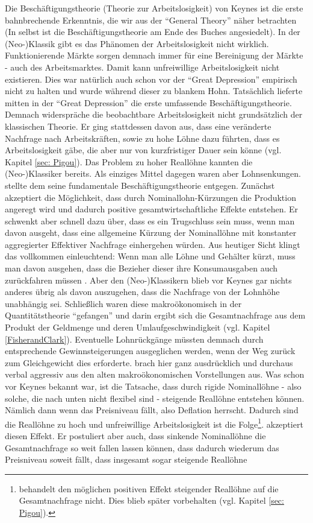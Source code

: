 Die Beschäftigungstheorie (Theorie zur Arbeitslosigkeit) von Keynes ist die erste bahnbrechende Erkenntnis, die wir aus der "`General Theory"' näher betrachten (In \textcite{Keynes1936} selbst ist die Beschäftigungstheorie am Ende des Buches angesiedelt). In der (Neo-)Klassik gibt es das Phänomen der Arbeitslosigkeit nicht wirklich. Funktionierende Märkte sorgen demnach immer für eine Bereinigung der Märkte - auch des Arbeitsmarktes. Damit kann unfreiwillige Arbeitslosigkeit nicht existieren. Dies war natürlich auch schon vor der "`Great Depression"' empirisch nicht zu halten und wurde während dieser zu blankem Hohn. Tatsächlich lieferte \textcite{Pigou1933} mitten in der "`Great Depression"' die erste umfassende Beschäftigungstheorie. Demnach widerspräche die beobachtbare Arbeitslosigkeit nicht grundsätzlich der klassischen Theorie. Er ging stattdessen davon aus, dass eine veränderte Nachfrage nach Arbeitskräften, sowie zu hohe Löhne dazu führten, dass es Arbeitslosigkeit gäbe, die aber nur von kurzfristiger Dauer sein könne (vgl. Kapitel \ref{sec: Pigou}). Das Problem zu hoher Reallöhne kannten die (Neo-)Klassiker bereits. Als einziges Mittel dagegen waren aber Lohnsenkungen. \textcite{Keynes1936} stellte dem seine fundamentale Beschäftigungstheorie entgegen. Zunächst akzeptiert \textcite[S. 258f]{Keynes1936} die Möglichkeit, dass durch Nominallohn-Kürzungen die Produktion angeregt wird und dadurch positive gesamtwirtschaftliche Effekte entstehen. Er schwenkt aber schnell dazu über, dass es ein Trugschluss sein muss, wenn man davon ausgeht, dass eine allgemeine Kürzung der Nominallöhne mit konstanter aggregierter Effektiver Nachfrage einhergehen würden. Aus heutiger Sicht klingt das vollkommen einleuchtend: Wenn man alle Löhne und Gehälter kürzt, muss man davon ausgehen, dass die Bezieher dieser ihre Konsumausgaben auch zurückfahren müssen \parencite[S. 269]{Keynes1936}. Aber den (Neo-)Klassikern blieb vor Keynes gar nichts anderes übrig als davon auszugehen, dass die Nachfrage von der Lohnhöhe unabhängig sei. Schließlich waren diese makroökonomisch in der Quantitätstheorie "`gefangen"' und darin ergibt sich die Gesamtnachfrage aus dem Produkt der Geldmenge und deren Umlaufgeschwindigkeit (vgl. Kapitel \ref{FisherandClark}). Eventuelle Lohnrückgänge müssten demnach durch entsprechende Gewinnsteigerungen ausgeglichen werden, wenn der Weg zurück zum Gleichgewicht dies erforderte. \textcite{Keynes1936} brach hier ganz ausdrücklich und durchaus verbal aggressiv aus den alten makroökonomischen Vorstellungen aus. Was schon vor Keynes bekannt war, ist die Tatsache, dass durch rigide Nominallöhne - also solche, die nach unten nicht flexibel sind - steigende Reallöhne entstehen können. Nämlich dann wenn das Preisniveau fällt, also Deflation herrscht. Dadurch sind die Reallöhne zu hoch und unfreiwillige Arbeitslosigkeit ist die Folge\footnote{\textcite{Keynes1936} behandelt den möglichen positiven Effekt steigender Reallöhne auf die Gesamtnachfrage nicht. Dies blieb später \textcite{Pigou1943} vorbehalten (vgl. Kapitel \ref{sec: Pigou}).}. \textcite{Keynes1936} akzeptiert diesen Effekt. Er postuliert aber auch, dass sinkende Nominallöhne die Gesamtnachfrage so weit fallen lassen können, dass dadurch wiederum das Preisniveau soweit fällt, dass insgesamt sogar steigende Reallöhne 